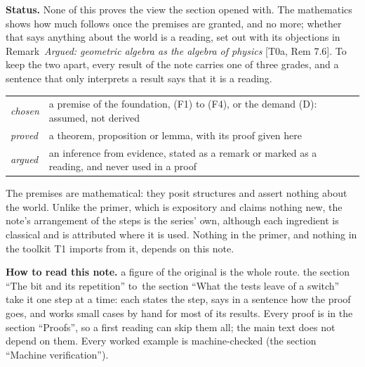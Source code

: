 \documentclass[11pt]{article}
\theoremstyle{definition}
\theoremstyle{plain}
\begin{document}
\label{c:note.geometry-first.setting-geometry-before-number-2}
\textbf{Status.} None of this proves the view the section opened with. The mathematics shows how much follows once the premises are granted, and no more; whether that says anything about the world is a reading, set out with its objections in Remark~\emph{Argued: geometric algebra as the algebra of physics} [T0a, Rem 7.6]. To keep the two apart, every result of the note carries one of three grades, and a sentence that only interprets a result says that it is a reading.
\begin{center}
\begin{tabular}{@{}lp{}@{}}
\toprule
\emph{chosen} & a premise of the foundation, (F1) to (F4), or the demand (D): assumed, not derived \\
\emph{proved} & a theorem, proposition or lemma, with its proof given here \\
\emph{argued} & an inference from evidence, stated as a remark or marked as a reading, and never used in a proof \\
\bottomrule
\end{tabular}
\end{center}
The premises are mathematical: they posit structures and assert nothing about the world. Unlike the primer, which is expository and claims nothing new, the note's arrangement of the steps is the series' own, although each ingredient is classical and is attributed where it is used. Nothing in the primer, and nothing in the toolkit T1 imports from it, depends on this note.

\label{c:note.geometry-first.setting-geometry-before-number-3}
\textbf{How to read this note.} a figure of the original is the whole route. the section ``The bit and its repetition'' to~the section ``What the tests leave of a switch'' take it one step at a time: each states the step, says in a sentence how the proof goes, and works small cases by hand for most of its results. Every proof is in the section ``Proofs'', so a first reading can skip them all; the main text does not depend on them. Every worked example is machine-checked (the section ``Machine verification'').
\end{document}
